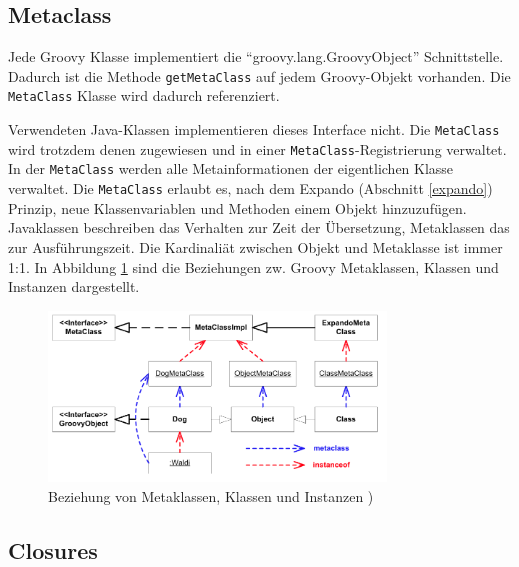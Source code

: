 \documentclass[11pt,english,ngerman, headsepline]{scrreprt}
\begin{document}
 \subsection{Metaclass}\label{Metaclass}
 
Jede Groovy Klasse implementiert die ``groovy.lang.GroovyObject''
 Schnittstelle.
Dadurch ist die Methode \texttt{getMetaClass} auf jedem Groovy-Objekt
vorhanden.
Die \texttt{MetaClass} Klasse wird dadurch referenziert.


Verwendeten Java-Klassen implementieren dieses Interface nicht. Die 
\texttt{MetaClass} wird trotzdem denen zugewiesen und in einer
\texttt{MetaClass}-Registrierung \cite{fowler2003patterns}
verwaltet.
In der \texttt{MetaClass} werden alle Metainformationen der eigentlichen Klasse
verwaltet. Die \texttt{MetaClass} erlaubt es, nach dem Expando (Abschnitt
\ref{expando}) Prinzip, neue Klassenvariablen und Methoden einem Objekt
hinzuzufügen.
Javaklassen beschreiben das Verhalten zur Zeit der Übersetzung, Metaklassen
das zur Ausführungszeit.
Die Kardinaliät zwischen Objekt und Metaklasse ist immer 1:1.
In Abbildung \ref{groovyMetaclassDiagram} sind die Beziehungen zw. Groovy
Metaklassen, Klassen und Instanzen dargestellt. 

\begin{figure}[h!]
	\begin{center}
	\includegraphics[width=0.8\textwidth]{pics/groovyMetaklassen}
	\end{center}
	\caption{Beziehung von Metaklassen, Klassen und Instanzen \cite{mpInGroovy})}
	\label{groovyMetaclassDiagram}
\end{figure}

\subsection{Closures}
\end{document}
